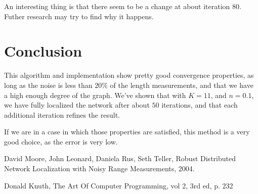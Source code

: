 \documentclass[letterpaper, 10 pt, conference]{ieeeconf}  %
\begin{document}
An interesting thing is that there seem to be a change at about iteration $80$. Futher research may try to find why it happens.


\section{Conclusion}

This algorithm and implementation show pretty good convergence properties, as long as the noise is less than $20\%$ of the length measurements, and that we have a high enough degree of the graph. We've shown that with $K=11$, and $n=0.1$, we have fully localized the network after about $50$ iterations, and that each additional iteration refines the result.

If we are in a case in which those properties are satisfied, this method is a very good choice, as the error is very low.

\begin{thebibliography}{99}

 David Moore, John Leonard, Daniela Rus, Seth Teller, Robust Distributed Network Localization with Noisy Range Measurements, 2004.

 Donald Knuth, The Art Of Computer Programming, vol 2, 3rd ed, p. 232





\end{thebibliography}
\end{document}
